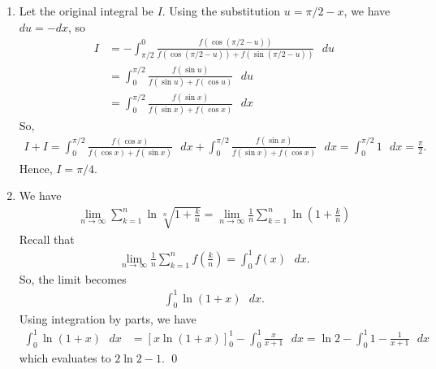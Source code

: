 \documentclass[12pt]{article}
\begin{document}
\begin{enumerate}[label=\textbf{(\alph*)}]
    \itemsep 0em
    \item Let the original integral be $I$. Using the substitution $u=\pi/2-x$, we have $du=-dx$, so \begin{align*}
        I&=-\int_{\pi/2}^{0}\frac{f\left(\operatorname{cos}\left(\pi/2-u\right)\right)}{f\left(\operatorname{cos}\left(\pi/2-u\right)\right)+f\left(\operatorname{sin}\left(\pi/2-u\right)\right)}\text{ }du\\
        &=\int_{0}^{\pi/2}\frac{f\left(\operatorname{sin}u\right)}{f\left(\operatorname{sin}u\right)+f\left(\operatorname{cos}u\right)}\text{ }du\\
        &=\int_{0}^{\pi/2}\frac{f\left(\operatorname{sin}x\right)}{f\left(\operatorname{sin}x\right)+f\left(\operatorname{cos}x\right)}\text{ }dx
    \end{align*}
    So, \begin{align*}
        I+I=\int_{0}^{\pi/2}\frac{f\left(\operatorname{cos}x\right)}{f\left(\operatorname{cos}x\right)+f\left(\operatorname{sin}x\right)}\text{ }dx+\int_{0}^{\pi/2}\frac{f\left(\operatorname{sin}x\right)}{f\left(\operatorname{sin}x\right)+f\left(\operatorname{cos}x\right)}\text{ }dx=\int_{0}^{\pi/2}1\text{ }dx=\frac{\pi}{2}.
    \end{align*}
    Hence, $I=\pi/4$.
    \item We have \begin{align*}
        \lim_{n\rightarrow\infty}\sum_{k=1}^{n}\operatorname{ln}\sqrt[n]{1+\frac{k}{n}}=\lim_{n\rightarrow\infty}\frac{1}{n}\sum_{k=1}^{n}\operatorname{ln}\left(1+\frac{k}{n}\right)
    \end{align*}
    Recall that \begin{align*}
        \lim_{n\rightarrow\infty}\frac{1}{n}\sum_{k=1}^{n}f\left(\frac{k}{n}\right)=\int_{0}^{1}f\left(x\right)\text{ }dx.
    \end{align*}
    So, the limit becomes \begin{align*}
        \int_{0}^{1}\operatorname{ln}\left(1+x\right)\text{ }dx.
    \end{align*}
    Using integration by parts, we have \begin{align*}
        \int_{0}^{1}\operatorname{ln}\left(1+x\right)\text{ }dx&=\left[x\operatorname{ln}\left(1+x\right)\right]_{0}^{1}-\int_{0}^{1}\frac{x}{x+1}\text{ }dx=\operatorname{ln}2-\int_{0}^{1}1-\frac{1}{x+1}\text{ }dx
    \end{align*}
    which evaluates to $2\operatorname{ln}2-1$. \qed 
\end{enumerate}
\newpage
\end{document}
